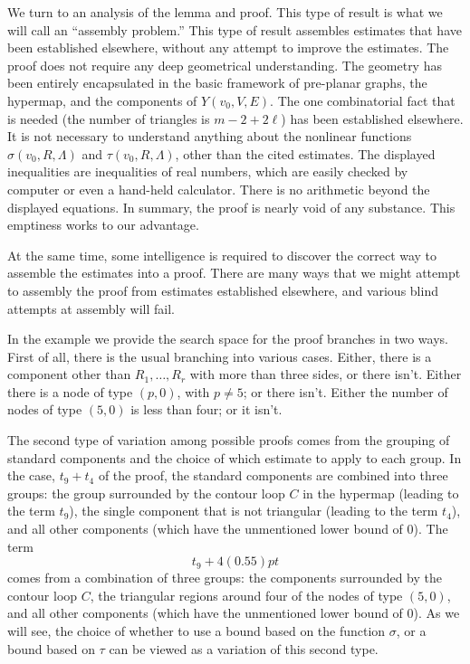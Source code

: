 We turn to an analysis of the lemma and proof.  This type of result is what
we will call an ``assembly problem.''  This type of result
assembles estimates that have been established elsewhere, without
any attempt to improve the estimates.  The proof
does not require any deep geometrical understanding.  The geometry
has been entirely encapsulated in the basic framework of
pre-planar graphs, the hypermap, and the components
of $Y(v_0,V,E)$.  The one combinatorial fact that is needed
(the number of triangles is $m-2+2\ell$) 
has been established elsewhere.  It is not necessary
to understand anything about the nonlinear functions $\sigma(v_0,R,\Lambda)$
and $\tau(v_0,R,\Lambda)$, other than the cited estimates.   
The displayed inequalities are inequalities of real numbers,
which are easily checked by computer
or even a hand-held calculator.  There is no arithmetic beyond
the displayed equations.
In summary,
the proof is nearly void of any substance.   This emptiness
works to our advantage.

At the same time, some intelligence is required to discover the
correct way to assemble the estimates into a proof.   There are
many ways that we might attempt to assembly the proof from estimates
established elsewhere, and various blind attempts at assembly will
fail.  

In the example we provide the search space for the proof
branches in two ways.  First of all, there is the usual branching
into various cases.  Either, there is a component other than
$R_1,\ldots,R_r$ with more than three sides, or there isn't.
Either there is a node of type $(p,0)$, with $p\ne 5$; or there isn't.
Either the number of nodes of type $(5,0)$ is less than four; or it isn't.

The second type of variation among possible proofs comes from
the grouping of standard components and the choice of which estimate
to apply to each group.  In the case, $t_9+t_4$ of the proof, the
standard components are combined into three groups:
the group surrounded by the contour loop $C$ in the hypermap
(leading to the term $t_9$), the single component that is not triangular
(leading to the term $t_4$), and all other components (which have
the unmentioned lower bound of $0$).  The term
   $$
   t_9 + 4(0.55)pt 
   $$
comes from a combination of three groups:
the components surrounded by the contour loop $C$, the triangular
regions around four of the nodes of type $(5,0)$, and all other
components (which have the unmentioned lower bound of $0$).
As we will see, the choice of whether to use a bound based on
the function $\sigma$, or a bound based on $\tau$ can be
viewed as a variation of this second type.

